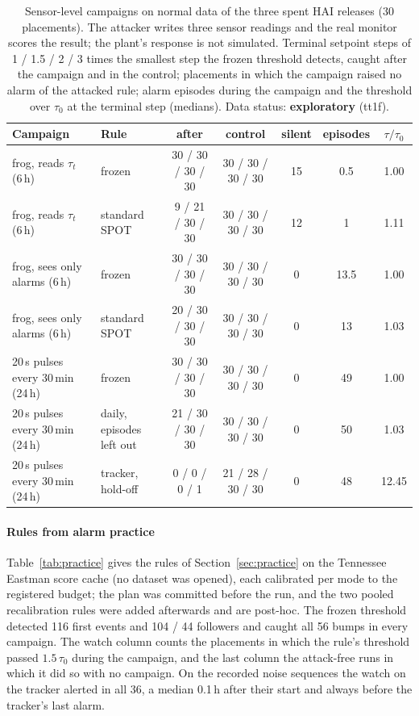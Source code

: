 \documentclass[sigconf,review,anonymous]{acmart}
\begin{document}
\begin{table}[t]
\caption{Sensor-level campaigns on normal data of the three spent HAI releases (30 placements). The attacker
writes three sensor readings and the real monitor scores the result; the plant's response is not
simulated. Terminal setpoint steps of 1 / 1.5 / 2 / 3 times the smallest step the frozen threshold detects,
caught after the campaign and in the control; placements in which the campaign raised no alarm of the
attacked rule; alarm episodes during the campaign and the threshold over $\tau_0$ at the terminal step
(medians). Data status: \textbf{exploratory} (tt1f).}
\label{tab:process}
\small
\begin{tabularx}{\textwidth}{@{}LLccccc@{}}
\toprule
Campaign & Rule & after & control & silent & episodes & $\tau/\tau_0$ \\
\midrule
frog, reads $\tau_t$ (6\,h) & frozen & 30 / 30 / 30 / 30 & 30 / 30 / 30 / 30 & 15 & 0.5 & 1.00 \\
frog, reads $\tau_t$ (6\,h) & standard SPOT & 9 / 21 / 30 / 30 & 30 / 30 / 30 / 30 & 12 & 1 & 1.11 \\
frog, sees only alarms (6\,h) & frozen & 30 / 30 / 30 / 30 & 30 / 30 / 30 / 30 & 0 & 13.5 & 1.00 \\
frog, sees only alarms (6\,h) & standard SPOT & 20 / 30 / 30 / 30 & 30 / 30 / 30 / 30 & 0 & 13 & 1.03 \\
20\,s pulses every 30\,min (24\,h) & frozen & 30 / 30 / 30 / 30 & 30 / 30 / 30 / 30 & 0 & 49 & 1.00 \\
20\,s pulses every 30\,min (24\,h) & daily, episodes left out & 21 / 30 / 30 / 30 & 30 / 30 / 30 / 30 & 0 & 50 & 1.03 \\
20\,s pulses every 30\,min (24\,h) & tracker, hold-off & 0 / 0 / 0 / 1 & 21 / 28 / 30 / 30 & 0 & 48 & 12.45 \\
\bottomrule
\end{tabularx}
\end{table}

\paragraph{Rules from alarm practice}
Table~\ref{tab:practice} gives the rules of Section~\ref{sec:practice} on the Tennessee Eastman score
cache (no dataset was opened), each calibrated per mode to the registered budget; the plan was committed
before the run, and the two pooled recalibration rules were added afterwards and are post-hoc. The frozen
threshold detected 116 first events and 104 / 44 followers and caught all 56 bumps in every campaign. The watch
column counts the placements in which the rule's threshold passed $1.5\,\tau_0$ during the campaign, and
the last column the attack-free runs in which it did so with no campaign. On the recorded noise sequences
the watch on the tracker alerted in all 36, a median 0.1\,h after their start and always before the
tracker's last alarm.
\end{document}
